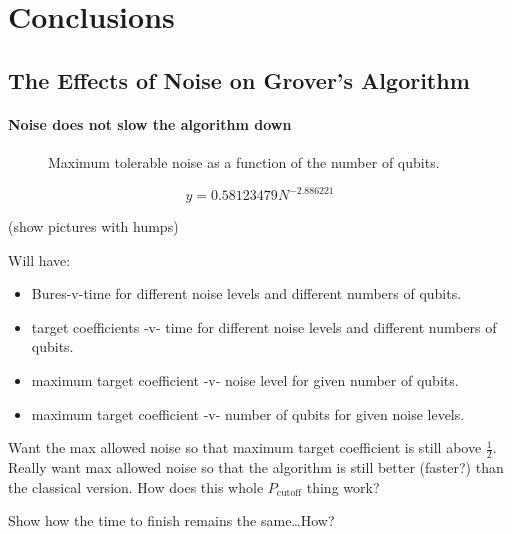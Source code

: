 
\chapter{Conclusions}
\label{chap:conclusion}
%

\section{The Effects of Noise on Grover's Algorithm}

\subsubsection{Noise does not slow the algorithm down}

\begin{figure}[h]
\begin{center}
\end{center}
\caption{Maximum tolerable noise as a function of the number of qubits.}
\end{figure}

\begin{equation}
y = 0.58123479 N^{-2.886221}
\end{equation}


(show pictures with humps)

Will have:
\begin{itemize}
\item Bures-v-time for different noise levels and different numbers of qubits.
\item target coefficients -v- time for different noise levels and different numbers
of qubits.
\item maximum target coefficient -v- noise level for given number of qubits.
\item maximum target coefficient -v- number of qubits for given noise levels.
\end{itemize}
Want the max allowed noise so that maximum target coefficient is still above 
$\frac{1}{2}$.  Really want max allowed noise so that the algorithm is still
better (faster?) than the classical version.  How does this whole
$P_{\text{cutoff}}$ thing work?\cite{Pablo-Norman/Ruiz-Altaba:99}

Show how the time to finish remains the same\dots How?



